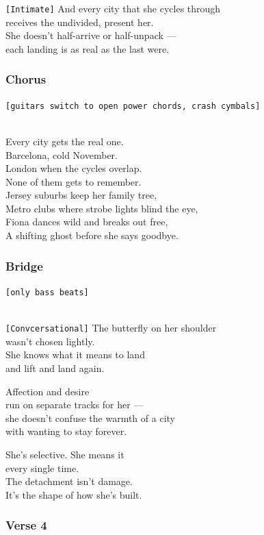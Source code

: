 \documentclass[]{article}
\begin{document}
\texttt{{[}Intimate{]}} And every city that she cycles through\\
receives the undivided, present her.\\
She doesn't half-arrive or half-unpack ---\\
each landing is as real as the last were.

\subsubsection{Chorus}\label{chorus-35}

\texttt{{[}guitars\ switch\ to\ open\ power\ chords,\ crash\ cymbals{]}}\strut \\
Every city gets the real one.\\
Barcelona, cold November.\\
London when the cycles overlap.\\
None of them gets to remember.\\
Jersey suburbs keep her family tree,\\
Metro clubs where strobe lights blind the eye,\\
Fiona dances wild and breaks out free,\\
A shifting ghost before she says goodbye.

\subsubsection{Bridge}\label{bridge-8}

\texttt{{[}only\ bass\ beats{]}}\strut \\
\texttt{{[}Convcersational{]}} The butterfly on her shoulder\\
wasn't chosen lightly.\\
She knows what it means to land\\
and lift and land again.

Affection and desire\\
run on separate tracks for her ---\\
she doesn't confuse the warmth of a city\\
with wanting to stay forever.

She's selective. She means it\\
every single time.\\
The detachment isn't damage.\\
It's the shape of how she's built.

\subsubsection{Verse 4}\label{verse-4-5}
\end{document}
